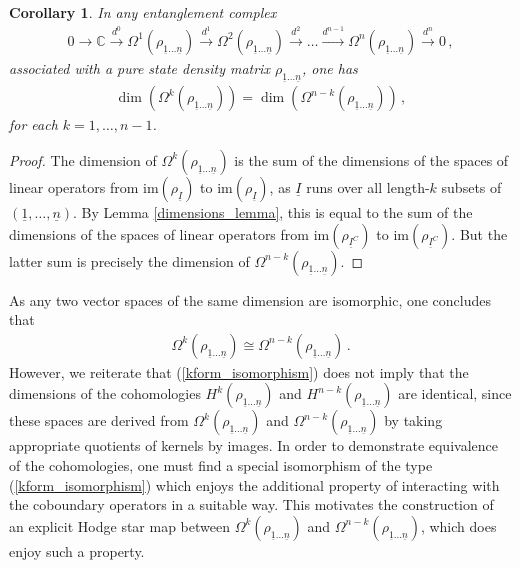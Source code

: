 \documentclass[12pt]{article}
\newtheorem{corollary}{Corollary}[section]
\newcommand{\ul}[1]{{\underline{#1}}}
\newcommand{\im}{\mathrm{im}}
\numberwithin{equation}{section}
\newcommand{\rhooneton}{{\rho_{\ul{1} \ldots \ul{n}}}}
\begin{document}
\begin{corollary}\label{same_dim_corollary}
    In any entanglement complex 
    \begin{align}
        0 \to \mathbb{C} \xrightarrow{d^0} \Omega^1 \left( \rho_{\ul{1} \ldots \ul{n}} \right) \xrightarrow{d^1} \Omega^2 \left( \rho_{\ul{1} \ldots \ul{n}} \right) \xrightarrow{d^2} \ldots \xrightarrow{d^{n-1}} \Omega^n \left( \rho_{\ul{1} \ldots \ul{n}} \right) \xrightarrow{d^n} 0 \, ,
    \end{align}
    associated with a pure state density matrix $\rhooneton$, one has
    \begin{align}
        \dim \left( \Omega^k \left( \rhooneton \right) \right) = \dim \left( \Omega^{n-k} \left( \rhooneton \right) \right) \, ,
    \end{align}
    for each $k = 1 , \ldots , n-1$.
\end{corollary}

\begin{proof}
    The dimension of $\Omega^k \left( \rhooneton \right)$ is the sum of the dimensions of the spaces of linear operators from $\im \left( \rho_{\ul{I}} \right)$ to $\im \left( \rho_{\ul{I}} \right)$, as $\ul{I}$ runs over all length-$k$ subsets of $(\ul{1}, \ldots, \ul{n})$. By Lemma \ref{dimensions_lemma}, this is equal to the sum of the dimensions of the spaces of linear operators from $\im \left( \rho_{\ul{I}^C} \right)$ to $\im \left( \rho_{\ul{I}^C} \right)$. But the latter sum is precisely the dimension of $\Omega^{n-k} \left( \rhooneton \right)$.
\end{proof}
%
As any two vector spaces of the same dimension are isomorphic, one concludes that
%
\begin{align}\label{kform_isomorphism}
    \Omega^k \left( \rhooneton \right) \cong \Omega^{n-k} \left( \rhooneton \right) \, .
\end{align}
%
However, we reiterate that (\ref{kform_isomorphism}) does not imply that the dimensions of the cohomologies $H^k ( \rhooneton )$ and $H^{n-k} ( \rhooneton )$ are identical, since these spaces are derived from $\Omega^k \left( \rhooneton \right)$ and $\Omega^{n-k} \left( \rhooneton \right)$ by taking appropriate quotients of kernels by images. In order to demonstrate equivalence of the cohomologies, one must find a special isomorphism of the type (\ref{kform_isomorphism}) which enjoys the additional property of interacting with the coboundary operators in a suitable way. This motivates the construction of an explicit Hodge star map between $\Omega^k \left( \rhooneton \right)$ and $\Omega^{n-k} \left( \rhooneton \right)$, which does enjoy such a property.
\end{document}
